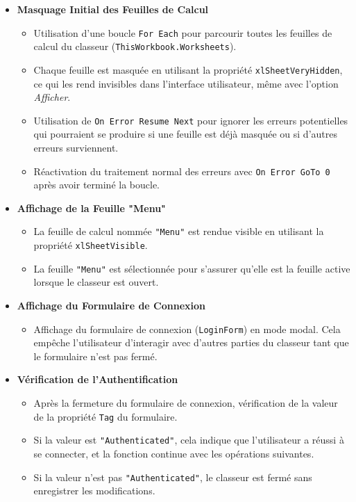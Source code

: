 \documentclass[a4paper, oneside, 12pt, final]{extreport}
\begin{document}
\begin{itemize}
    \item \textbf{Masquage Initial des Feuilles de Calcul}
    \begin{itemize}
        \item Utilisation d'une boucle \texttt{For Each} pour parcourir toutes les feuilles de calcul du classeur (\texttt{ThisWorkbook.Worksheets}).
        \item Chaque feuille est masquée en utilisant la propriété \texttt{xlSheetVeryHidden}, ce qui les rend invisibles dans l'interface utilisateur, même avec l'option \textit{Afficher}.
        \item Utilisation de \texttt{On Error Resume Next} pour ignorer les erreurs potentielles qui pourraient se produire si une feuille est déjà masquée ou si d'autres erreurs surviennent.
        \item Réactivation du traitement normal des erreurs avec \texttt{On Error GoTo 0} après avoir terminé la boucle.
    \end{itemize}

    \item \textbf{Affichage de la Feuille "Menu"}
    \begin{itemize}
        \item La feuille de calcul nommée \texttt{"Menu"} est rendue visible en utilisant la propriété \texttt{xlSheetVisible}.
        \item La feuille \texttt{"Menu"} est sélectionnée pour s'assurer qu'elle est la feuille active lorsque le classeur est ouvert.
    \end{itemize}

    \item \textbf{Affichage du Formulaire de Connexion}
    \begin{itemize}
        \item Affichage du formulaire de connexion (\texttt{LoginForm}) en mode modal. Cela empêche l'utilisateur d'interagir avec d'autres parties du classeur tant que le formulaire n'est pas fermé.
    \end{itemize}

    \item \textbf{Vérification de l'Authentification}
    \begin{itemize}
        \item Après la fermeture du formulaire de connexion, vérification de la valeur de la propriété \texttt{Tag} du formulaire.
        \item Si la valeur est \texttt{"Authenticated"}, cela indique que l'utilisateur a réussi à se connecter, et la fonction continue avec les opérations suivantes.
        \item Si la valeur n'est pas \texttt{"Authenticated"}, le classeur est fermé sans enregistrer les modifications.
    \end{itemize}


\end{itemize}
\end{document}
